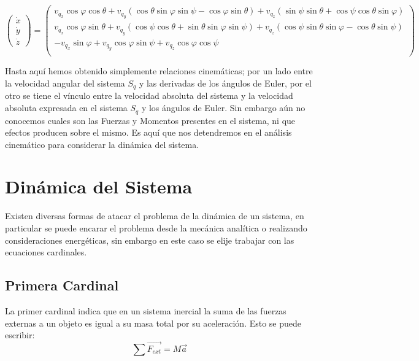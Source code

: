 \documentclass[main]{subfiles}
\begin{document}
\begin{footnotesize}

$$\left( \begin{array}{c}

\dot{x}\\
\dot{y}\\
\dot{z}
\end{array}  \right) = \left( \begin{array}{c}
v_{q_x} \cos \varphi \cos \theta + v_{q_y} ( \cos \theta \sin \varphi \sin \psi-\cos \varphi \sin \theta ) + v_{q_z}(\sin \psi \sin \theta + \cos \psi \cos \theta \sin \varphi)  \\
v_{q_x} \cos \varphi \sin \theta + v_{q_y} (\cos \psi \cos \theta + \sin \theta \sin \varphi \sin \psi) + v_{q_z}( \cos \psi \sin \theta \sin \varphi-\cos \theta \sin \psi ) \\
-v_{q_x} \sin \varphi  + v_{q_y} \cos \varphi \sin \psi  + v_{q_z}\cos \varphi \cos \psi \\
\end{array} \right)  $$
\end{footnotesize} 

Hasta aqu\'i hemos obtenido simplemente relaciones cinem\'aticas; por un lado entre la velocidad angular del sistema $S_q$ y las derivadas de los \'angulos de Euler, por el otro se tiene el v\'inculo entre la velocidad absoluta del sistema y la velocidad absoluta expresada en el sistema $S_q$ y los \'angulos de Euler. Sin embargo a\'un no conocemos cuales son las Fuerzas y Momentos presentes en el sistema, ni que efectos producen sobre el mismo. Es aqu\'i que nos detendremos en el an\'alisis cinem\'atico para considerar la din\'amica del sistema. 

\section{Din\'amica del Sistema}
Existen diversas formas de atacar el problema de la din\'amica de un sistema, en particular se puede encarar el problema desde la mec\'anica anal\'itica o realizando consideraciones energ\'eticas, sin embargo en este caso se elije trabajar con las ecuaciones cardinales. 
\subsection{Primera Cardinal}
 
La primer cardinal indica que en un sistema inercial la suma de las fuerzas externas a un objeto es igual a su masa total por su aceleraci\'on. Esto se puede escribir:
$$\sum \vec{F_{ext}} = M\vec{a}$$
\end{document}
